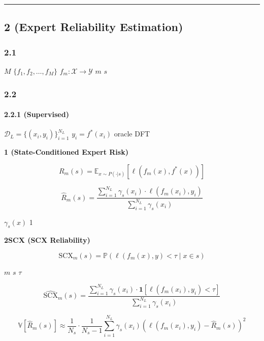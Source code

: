 \documentclass[
  12pt,
]{article}
\begin{document}
\begin{center}\rule{0.5\linewidth}{0.5pt}\end{center}

\subsection{ 2 (Expert Reliability
Estimation)}\label{ux6a21ux5757-2ux4e13ux5bb6ux53efux9760ux6027ux4f30ux8ba1-expert-reliability-estimation}

\subsubsection{2.1 }\label{ux95eeux9898ux8bbeux5b9a-1}

 \(M\)  \(\{f_1, f_2, \dots, f_M\}\)
\(f_m: \mathcal{X} \to \mathcal{Y}\) \(m\)
 \(s\)\textbf{}


\subsubsection{2.2 }\label{ux6570ux5b66ux6a21ux578b-1}

\paragraph{2.2.1 
(Supervised)}\label{ux6709ux6807ux7b7eux573aux666f-supervised}

 \(\mathcal{D}_L = \{(x_i, y_i)\}_{i=1}^{N_L}\)
\(y_i = f^*(x_i)\)  oracle DFT 

\textbf{ 1 (State-Conditioned Expert Risk)}

\[
R_m(s) = \mathbb{E}_{x \sim P(\cdot|s)} [ \ell(f_m(x), f^*(x)) ]
\]

 \[
\hat{R}_m(s) = \frac{\sum_{i=1}^{N_L} \gamma_s(x_i) \cdot \ell(f_m(x_i), y_i)}{\sum_{i=1}^{N_L} \gamma_s(x_i)}
\]

 \(\gamma_s(x)\)  1 

\textbf{ 2SCX  (SCX Reliability)}

\[
\text{SCX}_m(s) = \mathbb{P}( \ell(f_m(x), y) < \tau \mid x \in s )
\]

 \(m\)  \(s\) 
\(\tau\)

 \[
\widehat{\text{SCX}}_m(s) = \frac{\sum_{i=1}^{N_L} \gamma_s(x_i) \cdot \mathbf{1}[\ell(f_m(x_i), y_i) < \tau]}{\sum_{i=1}^{N_L} \gamma_s(x_i)}
\]

\textbf{}

\[
\mathbb{V}[\hat{R}_m(s)] \approx \frac{1}{N_s} \cdot \frac{1}{N_s - 1} \sum_{i=1}^{N_L} \gamma_s(x_i) \left( \ell(f_m(x_i), y_i) - \hat{R}_m(s) \right)^2
\]
\end{document}
